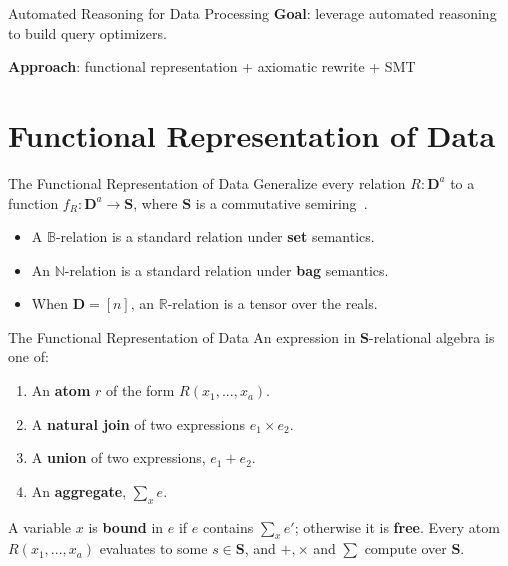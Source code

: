 \documentclass{beamer}
\newcommand{\B}{\mathbb B} %
\newcommand{\N}{\mathbb N} %
\newcommand{\R}{\mathbb R} %
\newcommand{\D}{\mathbf D} %
\newcommand{\SR}{\mathbf S} %
\begin{document}

  \begin{frame}{Automated Reasoning for Data Processing}
    \textbf{Goal}: leverage automated reasoning to build query optimizers.

    \textbf{Approach}: functional representation + axiomatic rewrite + SMT
  \end{frame}
  
  \section{Functional Representation of Data}
  \begin{frame}{The Functional Representation of Data}
    Generalize every relation $R : \D^a$ to a function 
    $f_R : \D^a \rightarrow \SR$,
    where $\SR$ is a commutative semiring~\cite{semiring}. \pause
    \begin{itemize}
      \item A $\B$-relation is a standard relation under \textbf{set} semantics. \pause
      \item An $\N$-relation is a standard relation under \textbf{bag} semantics. \pause
      \item When $\D = [n]$, an $\R$-relation is a tensor over the reals.
    \end{itemize}
  \end{frame}

  \begin{frame}{The Functional Representation of Data}
    An expression in $\SR$-relational algebra is one of:
    \begin{enumerate}
      \item An \textbf{atom} $r$ of the form $R(x_1, ..., x_a)$.
      \item A \textbf{natural join} of two expressions $e_1 \times e_2$.
      \item A \textbf{union} of two expressions, $e_1 + e_2$.
      \item An \textbf{aggregate},  $\sum_x e$.
    \end{enumerate} \pause
    A variable $x$ is \textbf{bound} in $e$ if $e$ contains $\sum_x e'$;
    otherwise it is \textbf{free}. \pause 
    Every atom $R(x_1, ..., x_a)$ evaluates to some $s \in \SR$, and
    $+, \times$ and $\sum$ compute over $\SR$.
  \end{frame}
\end{document}
